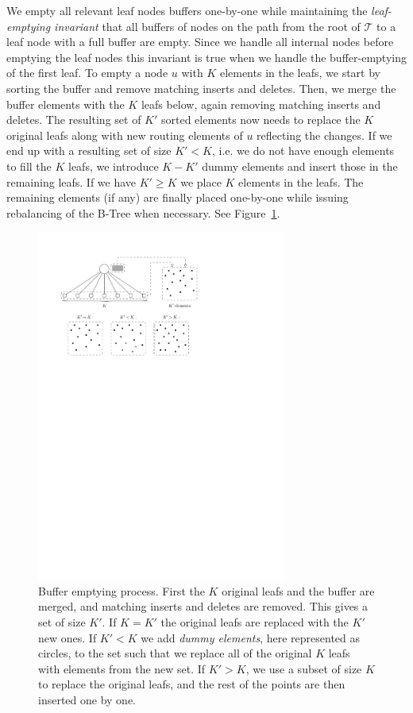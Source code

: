 \documentclass[twoside,11pt,openright]{report}
\begin{document}
We empty all relevant leaf nodes buffers one-by-one while maintaining the \textit{leaf-emptying invariant} that all buffers of nodes on the path from the root of $\mathcal{T}$ to a leaf node with a full buffer are empty. Since we handle all internal nodes before emptying the leaf nodes this invariant is true when we handle the buffer-emptying of the first leaf. To empty a node $u$ with $K$ elements in the leafs, we start by sorting the buffer and remove matching inserts and deletes. Then, we merge the buffer elements with the $K$ leafs below, again removing matching inserts and deletes. The resulting set of $K'$ sorted elements now needs to replace the $K$ original leafs along with new routing elements of $u$ reflecting the changes. If we end up with a resulting set of size $K' < K$, i.e. we do not have enough elements to fill the $K$ leafs, we introduce $K-K'$ dummy elements and insert those in the remaining leafs. If we have $K' \geq K$ we place $K$ elements in the leafs. The remaining elements (if any) are finally placed one-by-one while issuing rebalancing of the B-Tree when necessary. See Figure~\ref{fig:buffer_tree_buffer_empty}.

\begin{figure}[h]
	\centering
	\includegraphics[width=0.73\textwidth]{../figures/buffer_tree_buffer_empty}
	\caption{Buffer emptying process. First the $K$ original leafs and the buffer are merged, and matching inserts and deletes are removed. This gives a set of size $K'$. If $K = K'$ the original leafs are replaced with the $K'$ new ones. If $K' < K$ we add \textit{dummy elements}, here represented as circles, to the set such that we replace all of the original $K$ leafs with elements from the new set. If $K' > K$, we use a subset of size $K$ to replace the original leafs, and the rest of the points are then inserted one by one.}
	\label{fig:buffer_tree_buffer_empty}
\end{figure}
\end{document}
